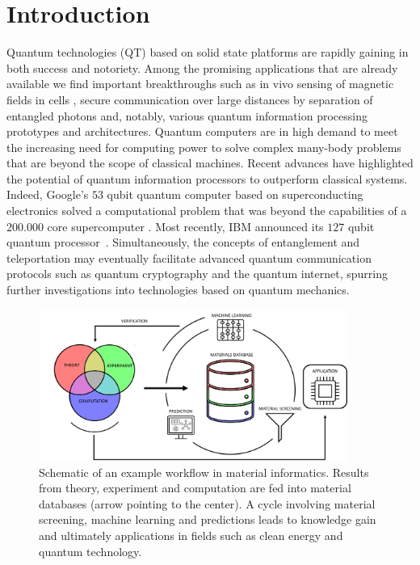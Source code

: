 \documentclass[superscriptaddress,unsortedaddress,
 amsmath,amssymb,
 aps,
]{revtex4-2}
\begin{document}


\maketitle

\section*{Introduction}
Quantum technologies (QT) based on solid state platforms are rapidly gaining in both success and notoriety. 
Among the promising applications that are already available we find important breakthroughs  such as in vivo sensing of magnetic fields in cells \cite{Lesage_2013}, secure communication over large distances by separation of entangled photons \cite{Ursin2007} and, notably, various quantum information processing prototypes and architectures.  
Quantum computers are in high demand to meet the increasing need for computing power to solve complex many-body problems that are beyond the scope of classical machines.   
Recent advances have highlighted the potential of quantum information processors to outperform classical systems. Indeed, Google's $53$ qubit quantum computer based on superconducting electronics solved a computational problem that was beyond the capabilities of a $200.000$ core supercomputer \cite{Arute_2019}. Most recently, IBM announced its $127$ qubit quantum processor~\cite{IBM2021}. Simultaneously, the concepts of entanglement and teleportation may eventually facilitate advanced quantum communication protocols such as quantum cryptography and the quantum internet, spurring further investigations into technologies based on quantum mechanics.

\begin{figure}[t]
    \centering
    \includegraphics[width=0.9\textwidth]{figures/ht-workflow-new-2.png}
    \caption{Schematic of an example workflow in material informatics. Results from theory, experiment and computation are fed into material databases (arrow pointing to the center). A cycle involving material screening, machine learning and predictions leads to knowledge gain and ultimately applications in fields such as clean energy and quantum technology. 
    }
    \label{fig:ht-workflow}
\end{figure}
\end{document}
